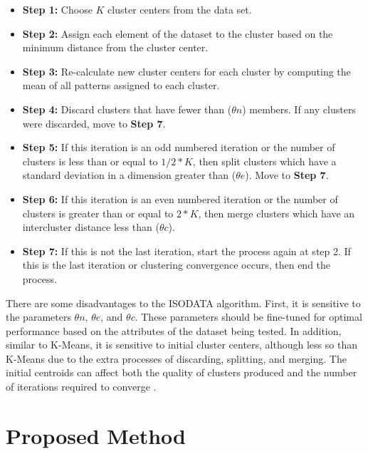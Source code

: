 \documentclass[a4paper, 10pt]{article}
\begin{document}
\begin{itemize}
      \item \textbf{Step 1:} Choose $K$ cluster centers from the data set.
      \item \textbf{Step 2:} Assign each element of the dataset to the cluster
            based on the minimum distance from the cluster center.
      \item \textbf{Step 3:} Re-calculate new cluster centers for each cluster
            by computing the mean of all patterns assigned to each cluster.
      \item \textbf{Step 4:} Discard clusters that have fewer than ($\theta n$)
            members. If any clusters were discarded, move to \textbf{Step 7}.
      \item \textbf{Step 5:} If this iteration is an odd numbered iteration or
            the number of clusters is less than or equal to  $1/2 * K$, then
            split clusters which have a standard deviation in a dimension
            greater than ($\theta e$). Move to \textbf{Step 7}.
      \item \textbf{Step 6:} If this iteration is an even numbered iteration or
            the number of clusters is greater than or equal to $2 * K$, then
            merge clusters which have an intercluster distance less than
            ($\theta c$).
      \item \textbf{Step 7:} If this is not the last iteration, start the
            process again at step 2. If this is the last iteration or clustering
            convergence occurs, then end the process.
\end{itemize}

There are some disadvantages to the ISODATA algorithm. First, it is sensitive to
the parameters $\theta n$, $\theta e$, and $\theta c$. These parameters should
be fine-tuned for optimal performance based on the attributes of the dataset
being tested. In addition, similar to K-Means, it is sensitive to initial
cluster centers, although less so than K-Means due to the extra processes of
discarding, splitting, and merging. The initial centroids can affect both the
quality of clusters produced and the number of iterations required to converge
\cite{Franti2018}.


\section{Proposed Method}
\end{document}
